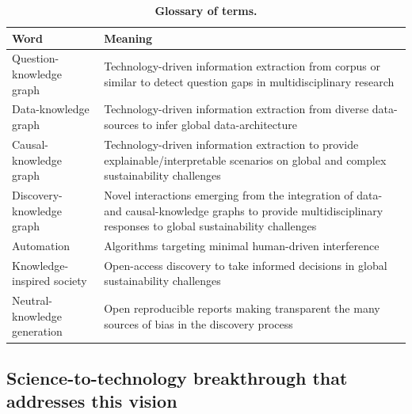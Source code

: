 \documentclass[11pt, a4paper]{article} %
\begin{document}
   
\begin{table}[ht]
\begin{tabular}{ p{6cm} | p{11cm}}
  \hline \hline
  \textbf{Word} &\textbf{Meaning}\\  \hline
  Question-knowledge graph & Technology-driven information extraction from corpus or similar to detect question gaps in multidisciplinary research\\ \hline
  Data-knowledge graph & Technology-driven information extraction from diverse data-sources to infer global data-architecture \\ \hline
  Causal-knowledge graph & Technology-driven information extraction to provide explainable/interpretable scenarios on global and complex sustainability challenges\\ \hline
  Discovery-knowledge graph & Novel interactions emerging from the integration of data- and causal-knowledge graphs to provide multidisciplinary responses to global sustainability challenges\\ \hline
  Automation & Algorithms targeting minimal human-driven interference\\ \hline
  Knowledge-inspired society & Open-access discovery to take informed decisions in global sustainability challenges \\ \hline
  Neutral-knowledge generation & Open reproducible reports making transparent the many sources of bias in the discovery process\\ \hline
  \bottomrule
\end{tabular}
\caption{{\bf Glossary of terms.}}
\end{table}

\subsection{Science-to-technology breakthrough that addresses this vision}
\end{document}
